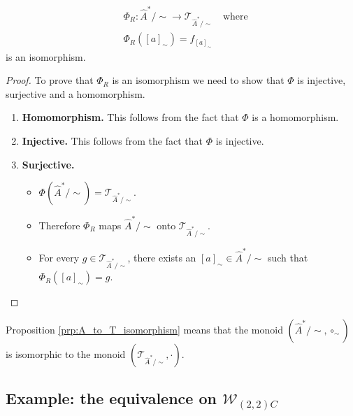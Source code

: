 \begin{proposition}\label{prp:A_to_T_isomorphism}
    \begin{equation}
        \begin{aligned}
             & \Phi_{R} : \hat{A}^{\ast}/\sim \to \mathcal{T}_{\hat{A}^{\ast}/\sim} \quad \text{where} \\
             & \Phi_{R}([a]_{\sim}) = f_{[a]_{\sim}}
        \end{aligned}
    \end{equation}
    is an isomorphism.
\end{proposition}
\begin{proof}
    To prove that $\Phi_{R}$ is an isomorphism we need to show that $\Phi$ is injective, surjective and a homomorphism.
    \begin{enumerate}[(1)]
        \item \textbf{Homomorphism.}
              This follows from the fact that $\Phi$ is a homomorphism.

        \item \textbf{Injective.}
              This follows from the fact that $\Phi$ is injective.

        \item \textbf{Surjective.}
              \begin{itemize}
                  \item $\Phi(\hat{A}^{\ast}/\sim) = \mathcal{T}_{\hat{A}^{\ast}/\sim}$.
                  \item Therefore $\Phi_{R}$ maps $\hat{A}^{\ast}/\sim$ onto $\mathcal{T}_{\hat{A}^{\ast}/\sim}$.
                  \item For every $g \in \mathcal{T}_{\hat{A}^{\ast}/\sim}$, there exists an $[a]_{\sim} \in \hat{A}^{\ast}/\sim$ such that $\Phi_{R}([a]_{\sim}) = g$.
              \end{itemize}
    \end{enumerate}
\end{proof}

Proposition \ref{prp:A_to_T_isomorphism} means that the monoid $(\hat{A}^{\ast}/\sim, \circ_{\sim})$ is isomorphic to the monoid $(\mathcal{T}_{\hat{A}^{\ast}/\sim}, \cdot)$.


\subsection{Example: the equivalence on $\mathscr{W}_{(2,2)C}$}

